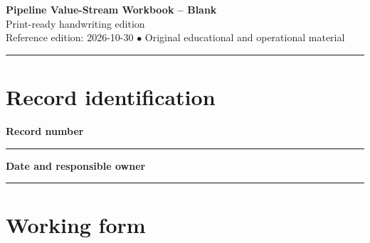 \documentclass[10pt,letterpaper]{article}
\begin{document}
\begin{center}
{\LARGE\bfseries\color{cdblue}Pipeline Value-Stream Workbook -- Blank}\\[7pt]
{\large Print-ready handwriting edition}\\[6pt]
{\small Reference edition: 2026-10-30 $\bullet$ Original educational and operational material}
\end{center}
\noindent\color{cdblue}\rule{\linewidth}{1.2pt}\color{black}
\vspace{0.4em}
\section{Record identification}
\textbf{Record number}\par
\noindent\rule{\linewidth}{0.35pt}\par\vspace{0.7em}
\textbf{Date and responsible owner}\par
\noindent\rule{\linewidth}{0.35pt}\par\vspace{0.7em}

\section{Working form}
\end{document}
